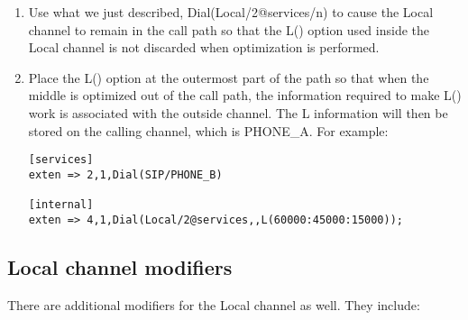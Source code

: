 \begin{enumerate}
\item Use what we just described, Dial(Local/2@services/n) to cause the Local
channel to remain in the call path so that the L() option used inside the
Local channel is not discarded when optimization is performed.
\item Place the L() option at the outermost part of the path so that when the middle
is optimized out of the call path, the information required to make L() work
is associated with the outside channel. The L information will then be stored
on the calling channel, which is PHONE\_A. For example:

\begin{verbatim}
[services]
exten => 2,1,Dial(SIP/PHONE_B)

[internal]
exten => 4,1,Dial(Local/2@services,,L(60000:45000:15000));
\end{verbatim}
\end{enumerate}

\subsection{Local channel modifiers}

There are additional modifiers for the Local channel as well. They include:

